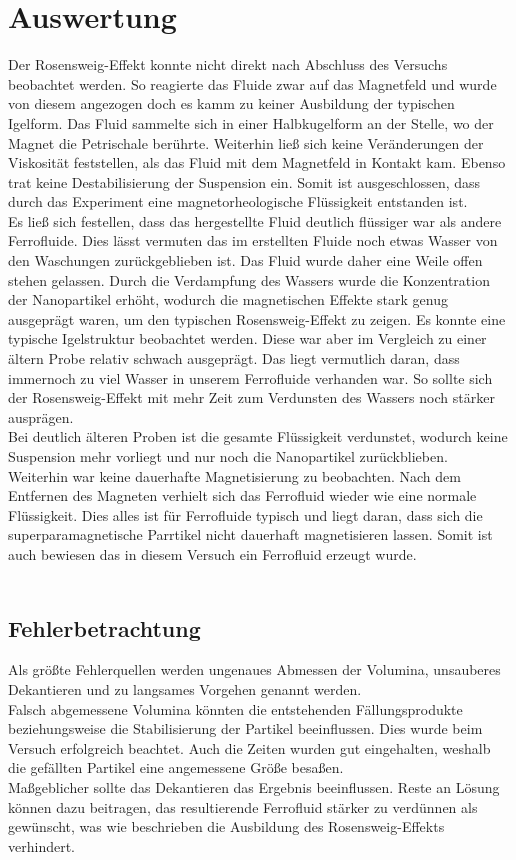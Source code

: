 \documentclass[a4paper]{TUBAFprotokoll}
\begin{document}
		\section{Auswertung}
		Der Rosensweig-Effekt konnte nicht direkt nach Abschluss des Versuchs beobachtet werden. So reagierte das Fluide zwar auf das Magnetfeld und wurde von diesem angezogen doch es kamm zu keiner Ausbildung der typischen Igelform. Das Fluid sammelte sich in einer Halbkugelform an der Stelle, wo der Magnet die Petrischale berührte. Weiterhin ließ sich keine Veränderungen der Viskosität feststellen, als das Fluid mit dem Magnetfeld in Kontakt kam. Ebenso trat keine Destabilisierung der Suspension ein. Somit ist ausgeschlossen, dass durch das Experiment eine magnetorheologische Flüssigkeit entstanden ist.\\
	Es ließ sich festellen, dass das hergestellte Fluid deutlich flüssiger war als andere Ferrofluide. Dies lässt vermuten das im erstellten Fluide noch etwas Wasser von den Waschungen zurückgeblieben ist. Das Fluid wurde daher eine Weile offen stehen gelassen. Durch die Verdampfung des Wassers wurde die Konzentration der Nanopartikel erhöht, wodurch die magnetischen Effekte stark genug ausgeprägt waren, um den typischen Rosensweig-Effekt zu zeigen. Es konnte eine typische Igelstruktur beobachtet werden. Diese war aber im Vergleich zu einer ältern Probe relativ schwach ausgeprägt. Das liegt vermutlich daran, dass immernoch zu viel Wasser in unserem Ferrofluide verhanden war. So sollte sich der Rosensweig-Effekt mit mehr Zeit zum Verdunsten des Wassers noch stärker ausprägen.\\
		Bei deutlich älteren Proben ist die gesamte Flüssigkeit verdunstet, wodurch keine Suspension mehr vorliegt und nur noch die Nanopartikel zurückblieben.\\
		Weiterhin war keine dauerhafte Magnetisierung zu beobachten. Nach dem Entfernen des Magneten verhielt sich das Ferrofluid wieder wie eine normale Flüssigkeit. Dies alles ist für Ferrofluide typisch und liegt daran, dass sich die superparamagnetische Parrtikel nicht dauerhaft magnetisieren lassen. Somit ist auch bewiesen das in diesem Versuch ein Ferrofluid erzeugt wurde.\\
		\\
		\subsection{Fehlerbetrachtung}
		Als größte Fehlerquellen werden ungenaues Abmessen der Volumina, unsauberes Dekantieren und zu langsames Vorgehen genannt werden. \\
Falsch abgemessene Volumina könnten die entstehenden Fällungsprodukte beziehungsweise die Stabilisierung der Partikel beeinflussen. Dies wurde beim Versuch 			erfolgreich beachtet. Auch die Zeiten wurden gut eingehalten, weshalb die gefällten Partikel eine angemessene Größe besaßen. \\
Maßgeblicher sollte das Dekantieren das Ergebnis beeinflussen. Reste an Lösung können dazu beitragen, das resultierende Ferrofluid stärker zu verdünnen als gewünscht, 	was wie beschrieben die Ausbildung des Rosensweig-Effekts verhindert.
	
\end{document}
